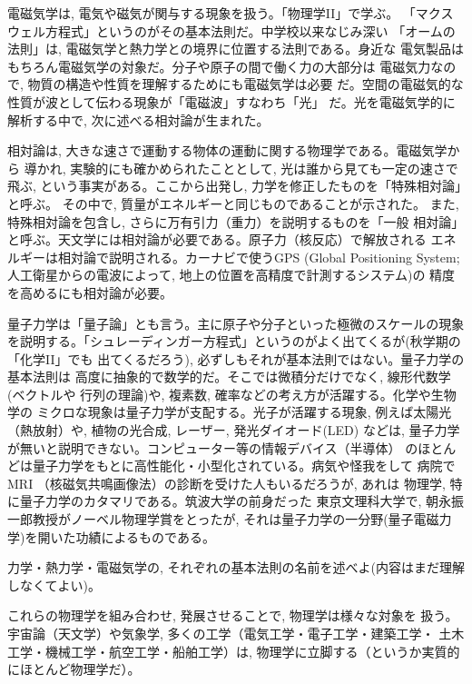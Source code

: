 電磁気学は, 電気や磁気が関与する現象を扱う。「物理学II」で学ぶ。
「マクスウェル方程式」というのがその基本法則だ。中学校以来なじみ深い
「オームの法則」は, 電磁気学と熱力学との境界に位置する法則である。身近な
電気製品はもちろん電磁気学の対象だ。分子や原子の間で働く力の大部分は
電磁気力なので, 物質の構造や性質を理解するためにも電磁気学は必要
だ。空間の電磁気的な性質が波として伝わる現象が「電磁波」すなわち「光」
だ。光を電磁気学的に解析する中で, 次に述べる相対論が生まれた。

相対論は, 大きな速さで運動する物体の運動に関する物理学である。電磁気学から
導かれ, 実験的にも確かめられたこととして, 光は誰から見ても一定の速さで飛ぶ, 
という事実がある。ここから出発し, 力学を修正したものを「特殊相対論」と呼ぶ。
その中で, 質量がエネルギーと同じものであることが示された。
また, 特殊相対論を包含し, さらに万有引力（重力）を説明するものを「一般
相対論」と呼ぶ。天文学には相対論が必要である。原子力（核反応）で解放される
エネルギーは相対論で説明される。カーナビで使うGPS (Global Positioning System; 
人工衛星からの電波によって, 地上の位置を高精度で計測するシステム)の
精度を高めるにも相対論が必要。

量子力学は「量子論」とも言う。主に原子や分子といった極微のスケールの現象
を説明する。「シュレーディンガー方程式」というのがよく出てくるが(秋学期の「化学II」でも
出てくるだろう), 必ずしもそれが基本法則ではない。量子力学の基本法則は
高度に抽象的で数学的だ。そこでは微積分だけでなく, 線形代数学(ベクトルや
行列の理論)や, 複素数, 確率などの考え方が活躍する。化学や生物学の
ミクロな現象は量子力学が支配する。光子が活躍する現象, 
例えば太陽光（熱放射）や, 植物の光合成, レーザー, 発光ダイオード(LED)
などは, 量子力学が無いと説明できない。コンピューター等の情報デバイス（半導体）
のほとんどは量子力学をもとに高性能化・小型化されている。病気や怪我をして
病院でMRI （核磁気共鳴画像法）の診断を受けた人もいるだろうが, あれは
物理学, 特に量子力学のカタマリである。筑波大学の前身だった
東京文理科大学で, 朝永振一郎教授がノーベル物理学賞をとったが, 
それは量子力学の一分野(量子電磁力学)を開いた功績によるものである。\mv

\begin{q}\label{q:basic_laws}
力学・熱力学・電磁気学の, それぞれの基本法則の名前を述べよ(内容はまだ理解しなくてよい)。
\end{q}
\vspace{0.2cm}

これらの物理学を組み合わせ, 発展させることで, 物理学は様々な対象を
扱う。宇宙論（天文学）や気象学, 多くの工学（電気工学・電子工学・建築工学・
土木工学・機械工学・航空工学・船舶工学）は, 物理学に立脚する（というか実質的
にほとんど物理学だ）。

